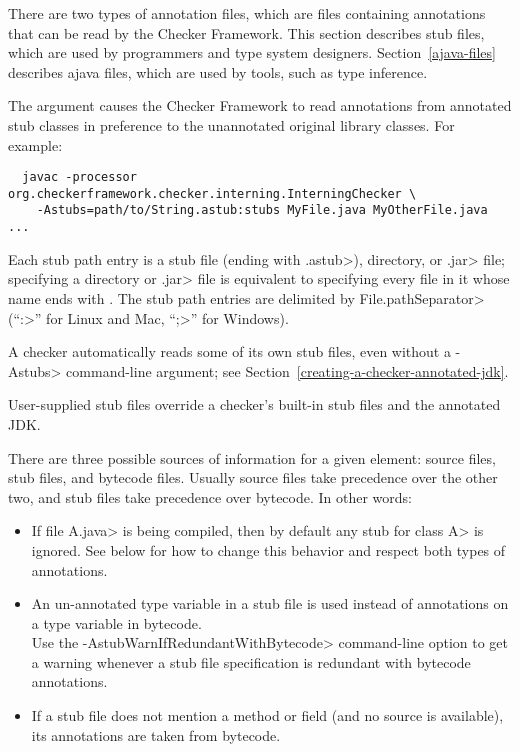 There are two types of annotation files, which are files containing annotations that
can be read by the Checker Framework.
This section describes stub files, which are used by programmers and
type system designers.
Section~\ref{ajava-files} describes ajava files, which are used by
tools, such as type inference.



The  argument causes the Checker Framework to read
annotations from annotated stub classes in preference to the unannotated
original library classes.  For example:

\begin{myxsmall}
\begin{Verbatim}
  javac -processor org.checkerframework.checker.interning.InterningChecker \
    -Astubs=path/to/String.astub:stubs MyFile.java MyOtherFile.java ...
\end{Verbatim}
\end{myxsmall}

Each stub path entry is a stub file (ending with \<.astub>), directory, or
\<.jar> file; specifying a directory or \<.jar> file is
equivalent to specifying every file in it whose name ends with
.  The stub path entries are delimited by
\<File.pathSeparator> (``\<:>'' for Linux and Mac, ``\<;>'' for Windows).

A checker automatically reads some of its own stub files, even without a
\<-Astubs> command-line argument; see
Section~\ref{creating-a-checker-annotated-jdk}.

User-supplied stub files override a checker's built-in stub files and the
annotated JDK\@.



There are three possible sources of information for a given
element: source files, stub files, and bytecode files.
Usually source files take precedence over the other two,
and stub files take precedence over bytecode.
In other words:
\begin{itemize}
\item
  If file \<A.java> is being compiled, then by default any stub for class
  \<A> is ignored.  See below for how to change this behavior and respect
  both types of annotations.
\item
  An un-annotated type variable in a stub file is used instead of
  annotations on a type variable in bytecode.
  \\
  Use the \<-AstubWarnIfRedundantWithBytecode> command-line option to get a
  warning whenever a stub file specification is redundant with bytecode
  annotations.
\item
  If a stub file does not mention a method or field (and no source is
  available), its annotations are taken from bytecode.
\end{itemize}

